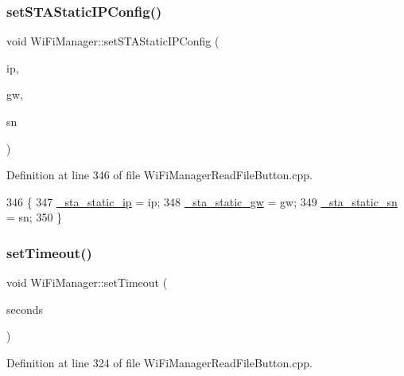 \subsubsection{\texorpdfstring{set\+S\+T\+A\+Static\+I\+P\+Config()}{setSTAStaticIPConfig()}}
{\footnotesize\ttfamily void Wi\+Fi\+Manager\+::set\+S\+T\+A\+Static\+I\+P\+Config (\begin{DoxyParamCaption}\item[{I\+P\+Address}]{ip,  }\item[{I\+P\+Address}]{gw,  }\item[{I\+P\+Address}]{sn }\end{DoxyParamCaption})}



Definition at line 346 of file Wi\+Fi\+Manager\+Read\+File\+Button.\+cpp.


\begin{DoxyCode}
346                                                                                \{
347   \hyperlink{class_wi_fi_manager_ad90d356096742a43b4540117b92faff0}{\_sta\_static\_ip} = ip;
348   \hyperlink{class_wi_fi_manager_a36648ca4819dc0feedaf9e1987d56d96}{\_sta\_static\_gw} = gw;
349   \hyperlink{class_wi_fi_manager_a3fd337255bce688189f9d450cc0ca3a3}{\_sta\_static\_sn} = sn;
350 \}
\end{DoxyCode}
\mbox{\label{class_wi_fi_manager_aa6493d59c284ff245edb767ff684756d}} 
\subsubsection{\texorpdfstring{set\+Timeout()}{setTimeout()}}
{\footnotesize\ttfamily void Wi\+Fi\+Manager\+::set\+Timeout (\begin{DoxyParamCaption}\item[{unsigned long}]{seconds }\end{DoxyParamCaption})}



Definition at line 324 of file Wi\+Fi\+Manager\+Read\+File\+Button.\+cpp.


